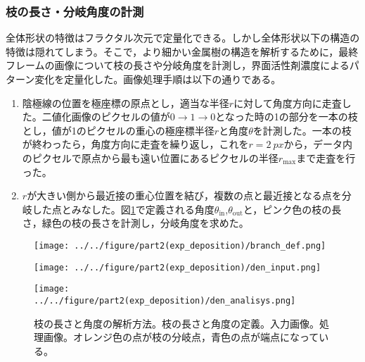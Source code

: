 \documentclass[autodetect-engine,dvi=dvipdfmx,a4paper,ja=standard,oneside,openany,11pt]{bxjsbook}
\begin{document}
\subsubsection{枝の長さ・分岐角度の計測}
全体形状の特徴はフラクタル次元で定量化できる。しかし全体形状以下の構造の特徴は隠れてしまう。そこで，より細かい金属樹の構造を解析するために，最終フレームの画像について枝の長さや分岐角度を計測し，界面活性剤濃度によるパターン変化を定量化した。画像処理手順は以下の通りである。
\begin{enumerate}
  \item 陰極線の位置を極座標の原点とし，適当な半径$r$に対して角度方向に走査した。二値化画像のピクセルの値が$0\rightarrow1\rightarrow0$となった時の1の部分を一本の枝とし，値が1のピクセルの重心の極座標半径$r$と角度$\theta$を計測した。一本の枝が終わったら，角度方向に走査を繰り返し，これを$r=\SI{2}{px}$から，データ内のピクセルで原点から最も遠い位置にあるピクセルの半径$r_{\mathrm{max}}$まで走査を行った。
  \item $r$が大きい側から最近接の重心位置を結び，複数の点と最近接となる点を分岐した点とみなした。図\ref{fig:branch_def_input}で定義される角度$\theta_{\mathrm{in}}$,$\theta_{\mathrm{out}}$と，ピンク色の枝の長さ，緑色の枝の長さを計測し，分岐角度を求めた。
\end{enumerate}

\begin{figure}
  \begin{minipage}
    {0.32\textwidth}
    \subcaption{}
    \centering
    \texttt{[image: ../../figure/part2(exp\_deposition)/branch\_def.png]}
    \label{fig:branch_def}
  \end{minipage}
  \begin{minipage}
    {0.32\textwidth}
    \subcaption{}
    \centering
    \texttt{[image: ../../figure/part2(exp\_deposition)/den\_input.png]}
    \label{fig:den_input}
  \end{minipage}
  \begin{minipage}
    {0.32\textwidth}
    \subcaption{}
    \centering
    \texttt{[image: ../../figure/part2(exp\_deposition)/den\_analisys.png]}
    \label{fig:den_analisys}
  \end{minipage}
  \caption{枝の長さと角度の解析方法。枝の長さと角度の定義。入力画像。処理画像。オレンジ色の点が枝の分岐点，青色の点が端点になっている。}
  \label{fig:branch_def_input}
\end{figure}
\end{document}
